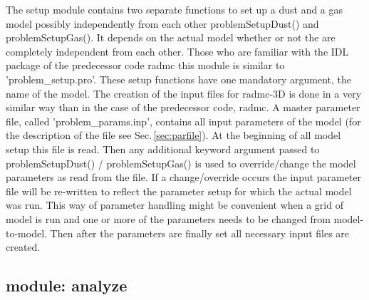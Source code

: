 \documentclass[12pt]{article}
\begin{document}
The setup module contains two separate functions to set up a dust and a gas model
possibly independently from each other problemSetupDust() and problemSetupGas(). 
It depends on the actual model whether  or not the are completely independent from each other.  Those who are familiar with the 
IDL package of the predecessor code radmc this module is similar to 'problem\_setup.pro'. 
These setup functions have one mandatory  argument, the name of the model. 
The creation of the input files for radmc-3D is done in a very similar way than in the case of the predecessor code, radmc. 
A master parameter file, called 'problem\_params.inp', contains all input parameters of the model (for the description of the file
see Sec.\,\ref{sec:parfile}). At the beginning of all model setup this file is read. Then any additional keyword argument
passed to problemSetupDust() / problemSetupGas() is used to override/change the model parameters as read from the file.
If a change/override occurs the input parameter file will be re-written to reflect the parameter setup for which the actual model
was run. This way of parameter handling might be convenient when a grid of model is run and one or more of the parameters
needs to be changed from model-to-model. Then after the parameters are finally set all necessary input files are created. 
%
%
%

\subsection{module: analyze}
\label{subsec:analyze}
\end{document}
